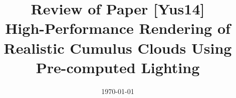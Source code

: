 \documentclass[a4paper, 12pt, oneside]{report}         %
\author{\textbf{Huanxiang Wang\begin{LARGE}
•
\end{LARGE}} \\14333168}
\title{{\Huge Review of Paper [Yus14]} \\ \textbf{High-Performance Rendering of Realistic Cumulus Clouds
Using Pre-computed Lighting}}
\date{\today}
\begin{document}
\maketitle

\tableofcontents
\listoftables
\listoffigures

                              

       


\begin{appendix}

%
\end{appendix}



\begin{thebibliography}{ieeetr}                   %



\end{thebibliography}                             %
\end{document}
